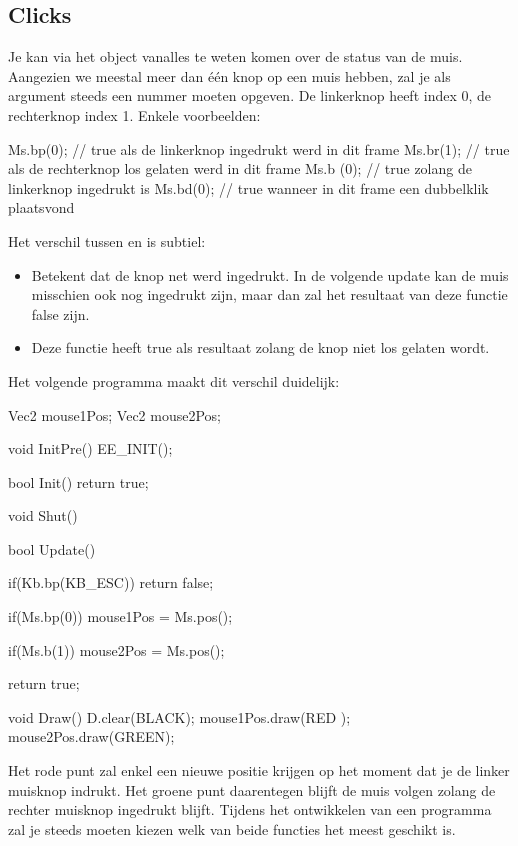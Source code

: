 \subsection{Clicks}
Je kan via het  object vanalles te weten komen over de status van de muis. Aangezien we meestal meer dan \'e\'en knop op een muis hebben, zal je als argument steeds een nummer moeten opgeven. De linkerknop heeft index 0, de rechterknop index 1. Enkele voorbeelden: 

\begin{code}
Ms.bp(0); // true als de linkerknop ingedrukt werd in dit frame
Ms.br(1); // true als de rechterknop los gelaten werd in dit frame
Ms.b (0); // true zolang de linkerknop ingedrukt is
Ms.bd(0); // true wanneer in dit frame een dubbelklik plaatsvond
\end{code}

Het verschil tussen  en  is subtiel:
\begin{itemize}
	\item {} Betekent dat de knop net werd ingedrukt. In de volgende update kan de muis misschien ook nog ingedrukt zijn, maar dan zal het resultaat van deze functie false zijn.
	\item {} Deze functie heeft true als resultaat zolang de knop niet los gelaten wordt.
\end{itemize}

Het volgende programma maakt dit verschil duidelijk:

\begin{code}
Vec2 mouse1Pos;
Vec2 mouse2Pos;

void InitPre()
{
   EE_INIT();
}

bool Init()
{   
   return true;
}

void Shut() {}

bool Update()
{
   if(Kb.bp(KB_ESC)) return false;
   
   if(Ms.bp(0)) {
      mouse1Pos = Ms.pos();
   }
   
   if(Ms.b(1)) {
      mouse2Pos = Ms.pos();
   }
   
   return true;
}

void Draw()
{
   D.clear(BLACK);
   mouse1Pos.draw(RED  );
   mouse2Pos.draw(GREEN);
}
\end{code}

Het rode punt zal enkel een nieuwe positie krijgen op het moment dat je de linker muisknop indrukt. Het groene punt daarentegen blijft de muis volgen zolang de rechter muisknop ingedrukt blijft. Tijdens het ontwikkelen van een programma zal je steeds moeten kiezen welk van beide functies het meest geschikt is.

